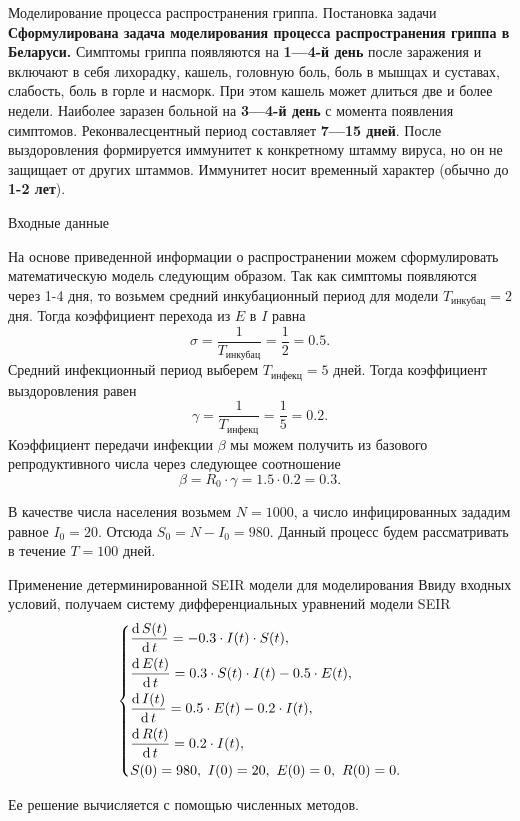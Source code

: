 \documentclass[notheorems]{beamer}
\renewcommand{\d}{\operatorname{d}}
\begin{document}


\begin{frame}
	{Моделирование процесса распространения гриппа. Постановка задачи
	}
	\textbf{Сформулирована задача моделирования процесса распространения гриппа в Беларуси.}
	Симптомы гриппа появляются на \textbf{1—4-й день} после заражения и включают в себя лихорадку, кашель, головную боль, боль в мышцах и суставах, слабость, боль в горле и насморк. При этом кашель может длиться две и более недели. Наиболее заразен больной на \textbf{3—4-й день} с момента появления симптомов. Реконвалесцентный период составляет \textbf{7—15 дней}. После выздоровления формируется иммунитет к конкретному штамму вируса, но он не защищает от других штаммов. Иммунитет носит временный характер (обычно до \textbf{1-2 лет}).
\end{frame}

\begin{frame}
	{Входные данные}
\small {На основе приведенной информации о распространении можем сформулировать математическую модель следующим образом. Так как симптомы появляются через 1-4 дня, то возьмем средний инкубационный период для модели $T_\text{инкубац} = 2$ дня. Тогда коэффициент перехода из $E$ в $I$ равна
$$\sigma = \dfrac{1}{T_\text{инкубац}} = \dfrac 1 2 = 0.5.$$
Средний инфекционный период выберем $T_\text{инфекц}=5$ дней.
Тогда коэффициент выздоровления равен
$$\gamma = \dfrac{1}{T_\text{инфекц}} = \dfrac 1 5 = 0.2.$$
Коэффициент передачи инфекции $\beta$ мы можем получить из  базового репродуктивного числа через следующее соотношение
$$\beta = R_0\cdot \gamma = 1.5\cdot 0.2 = 0.3.$$

В качестве числа населения возьмем $N=1000$, а число инфицированных зададим равное $I_0 = 20$. Отсюда $S_0 = N - I_0 = 980$. Данный процесс будем рассматривать в течение $T=100$ дней.}
\end{frame}


\begin{frame}
	{Применение детерминированной SEIR модели для моделирования}
	Ввиду входных условий, получаем систему дифференциальных уравнений модели SEIR
	\begin{equation*}
		\begin{dcases}
			\dfrac {\d S(t)}{\d t} = - 0.3 \cdot I(t)\cdot S(t),\\
			\dfrac {\d E(t)}{\d t} = 0.3 \cdot S(t)\cdot I(t) - 0.5\cdot E(t),\\
			\dfrac{\d I(t)}{\d t} =0.5 \cdot E(t) - 0.2\cdot I(t),\\
			\dfrac{\d R(t)}{\d t} = 0.2\cdot I(t),\\
			S(0) = 980,\ I(0) = 20,\ E(0) = 0,\ R(0) = 0.
		\end{dcases}
	\end{equation*} 
	
	Ее решение вычисляется с помощью численных методов.
\end{frame}
\end{document}
